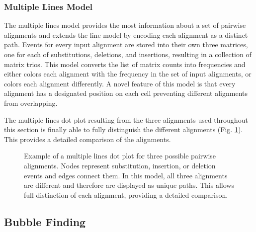 \subsubsection{Multiple Lines Model}

The multiple lines model provides the most information about a set of pairwise alignments and extends the line model by encoding each alignment as a distinct path. Events for every input alignment are stored into their own three matrices, one for each of substitutions, deletions, and insertions, resulting in a collection of matrix trios. This model converts the list of matrix counts into frequencies and either colors each alignment with the frequency in the set of input alignments, or colors each alignment differently. A novel feature of this model is that every alignment has a designated position on each cell preventing different alignments from overlapping.

The multiple lines dot plot resulting from the three alignments used throughout this section is finally able to fully distinguish the different alignments (Fig. \ref{fig:mlines}). This provides a detailed comparison of the alignments.

\begin{figure}[!ht]
    \centering
    \begin{subfigure}[c]{0.6\textwidth}
        \centering
        \scalebox{0.8}{}
        \caption{}
     \end{subfigure}
     \hspace{3.2em}
    \begin{subfigure}[c]{0.8\textwidth}
        \centering
        \hspace*{-1em}\resizebox{1.1\textwidth}{!}{}
        \caption{}
     \end{subfigure}
    \caption[Multiple Lines Dot Plot Model]{Example of a multiple lines dot plot for three possible pairwise alignments. Nodes represent substitution, insertion, or deletion events and edges connect them. In this model, all three alignments are different and therefore are displayed as unique paths. This allows full distinction of each alignment, providing a detailed comparison.}
    \label{fig:mlines}
\end{figure}

\subsection{Bubble Finding}

